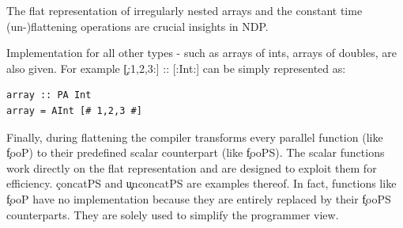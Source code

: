       The flat representation of irregularly nested arrays
      and the constant time (un-)flattening operations are crucial insights in
      NDP.
      
      Implementation for all other types - such as arrays of ints,
      arrays of doubles, are also given. For example \c{[:1,2,3:] :: [:Int:]} can be simply
      represented as:
      \begin{lstlisting}
array :: PA Int
array = AInt [# 1,2,3 #]
      \end{lstlisting}
      
      Finally, during flattening the compiler transforms
      every parallel function (like \c{fooP}) to
      their predefined scalar counterpart (like \c{fooPS}).
      The scalar functions work directly on the flat representation
      and are designed to exploit them for efficiency.
      \c{concatPS} and \c{unconcatPS} are examples thereof.
      In fact, functions like \c{fooP} have no implementation
      because they are entirely replaced by their \c{fooPS} counterparts.
      They are solely used to simplify the programmer view.
    
      
